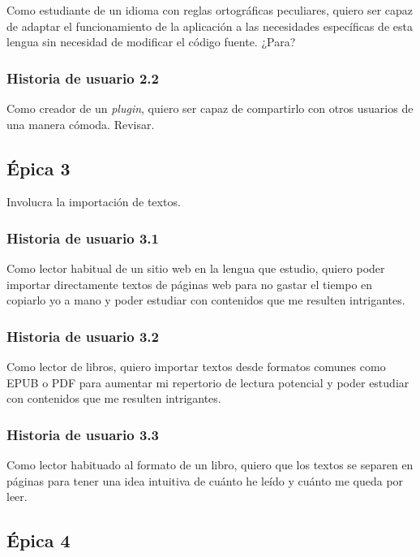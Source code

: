 Como estudiante de un idioma con reglas ortográficas peculiares, quiero ser capaz de adaptar el funcionamiento de la aplicación a las necesidades específicas de esta lengua sin necesidad de modificar el código fuente. \todo ¿Para?

\subsubsection{Historia de usuario 2.2}

Como creador de un \textit{plugin}, quiero ser capaz de compartirlo con otros usuarios de una manera cómoda. \todo Revisar.

\subsection{Épica 3}

Involucra la importación de textos.

\subsubsection{Historia de usuario 3.1}

Como lector habitual de un sitio web en la lengua que estudio, quiero poder importar directamente textos de páginas web para no gastar el tiempo en copiarlo yo a mano y poder estudiar con contenidos que me resulten intrigantes.

\subsubsection{Historia de usuario 3.2}

Como lector de libros, quiero importar textos desde formatos comunes como EPUB o PDF para aumentar mi repertorio de lectura potencial y poder estudiar con contenidos que me resulten intrigantes.

\subsubsection{Historia de usuario 3.3}

Como lector habituado al formato de un libro, quiero que los textos se separen en páginas para tener una idea intuitiva de cuánto he leído y cuánto me queda por leer.

\subsection{Épica 4}

